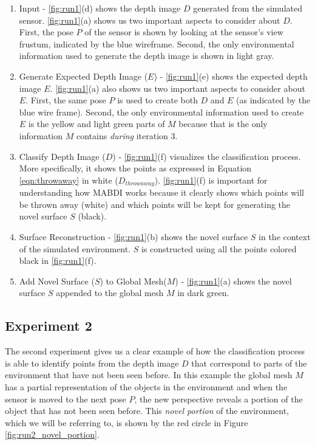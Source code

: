 \begin{sloppypar} %
\begin{enumerate}
  \item Input - \ref{fig:run1}(d) shows the depth image $D$ generated from the
  simulated sensor. \ref{fig:run1}(a) shows us two important aspects to consider
  about $D$. First, the pose $P$ of the sensor is shown by looking at the
  sensor's view frustum, indicated by the blue wireframe. Second, the only
  environmental information used to generate the depth image is shown in light
  gray.
  \item Generate Expected Depth Image ($E$) - \ref{fig:run1}(e) shows the
  expected depth image $E$. \ref{fig:run1}(a) also shows us two important
  aspects to consider about $E$. First, the same pose $P$ is used to create both
  $D$ and $E$ (as indicated by the blue wire frame). Second, the only
  environmental information used to create $E$ is the yellow and light green
  parts of $M$ because that is the only information $M$ contains \emph{during}
  iteration 3.
  \item Classify Depth Image ($D$) - \ref{fig:run1}(f) visualizes the
  classification process. More specifically, it shows the points as expressed in
  Equation \ref{eqn:throwaway} in white ($D_{throwaway}$). \ref{fig:run1}(f) is
  important for understanding how MABDI works because it clearly shows which
  points will be thrown away (white) and which points will be kept for
  generating the novel surface $S$ (black).
  \item Surface Reconstruction - \ref{fig:run1}(b) shows the novel surface $S$
  in the context of the simulated environment. $S$ is constructed using all the
  points colored black in \ref{fig:run1}(f).
  \item Add Novel Surface ($S$) to Global Mesh($M$) - \ref{fig:run1}(a) shows
  the novel surface $S$ appended to the global mesh $M$ in dark green.
\end{enumerate}
\end{sloppypar}

\subsection{Experiment 2}

The second experiment gives us a clear example of how the classification process
is able to identify points from the depth image $D$ that correspond to parts of
the environment that have not been seen before. In this example the global mesh
$M$ has a partial representation of the objects in the environment and when the
sensor is moved to the next pose $P$, the new perspective reveals a portion of
the object that has not been seen before. This \emph{novel portion} of the
environment, which we will be referring to, is shown by the red circle in Figure
\ref{fig:run2_novel_portion}.

